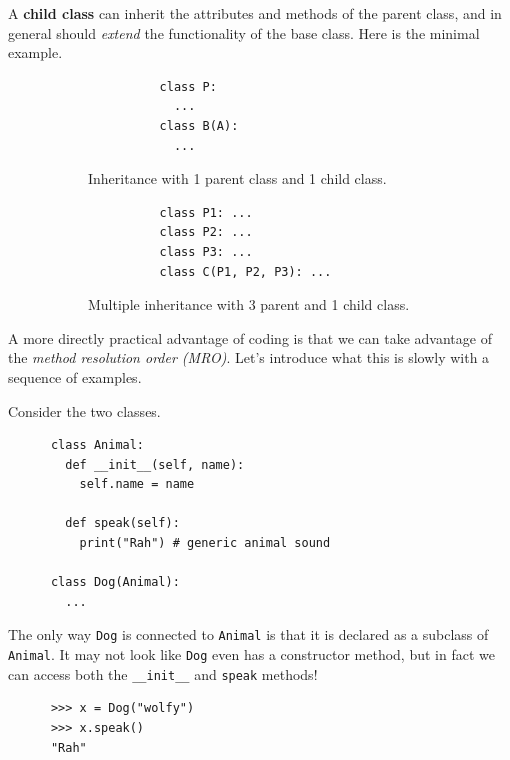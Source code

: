   \begin{definition}
    \label{def:class-inheritance}
    A \textbf{child class} can inherit the attributes and methods of the parent class, and in general should \textit{extend} the functionality of the base class. Here is the minimal example. 

    \begin{figure}[H]
      \centering
      \begin{subfigure}[b]{0.48\textwidth}
        \centering
        \begin{lstlisting}
          class P: 
            ... 
          class B(A): 
            ...
        \end{lstlisting}
        \caption{Inheritance with 1 parent class and 1 child class.}
      \end{subfigure}
      \hfill 
      \begin{subfigure}[b]{0.48\textwidth}
        \centering
        \begin{lstlisting}
          class P1: ... 
          class P2: ...
          class P3: ... 
          class C(P1, P2, P3): ...
        \end{lstlisting}
        \caption{Multiple inheritance with 3 parent and 1 child class.}
      \end{subfigure}
      \caption{}
    \end{figure}
  \end{definition}


  A more directly practical advantage of coding is that we can take advantage of the \textit{method resolution order (MRO)}. Let's introduce what this is slowly with a sequence of examples. 

  \begin{example}
    \label{ex:methods-of-parent-are-accessible-from-child}
    Consider the two classes. 
    \begin{lstlisting}
      class Animal: 
        def __init__(self, name): 
          self.name = name 

        def speak(self): 
          print("Rah") # generic animal sound

      class Dog(Animal): 
        ...
    \end{lstlisting} 
    The only way \texttt{Dog} is connected to \texttt{Animal} is that it is declared as a subclass of \texttt{Animal}. It may not look like \texttt{Dog} even has a constructor method, but in fact we can access both the \texttt{\_\_init\_\_} and \texttt{speak} methods! 
    \begin{lstlisting} 
      >>> x = Dog("wolfy") 
      >>> x.speak() 
      "Rah"
    \end{lstlisting}
  \end{example} 


